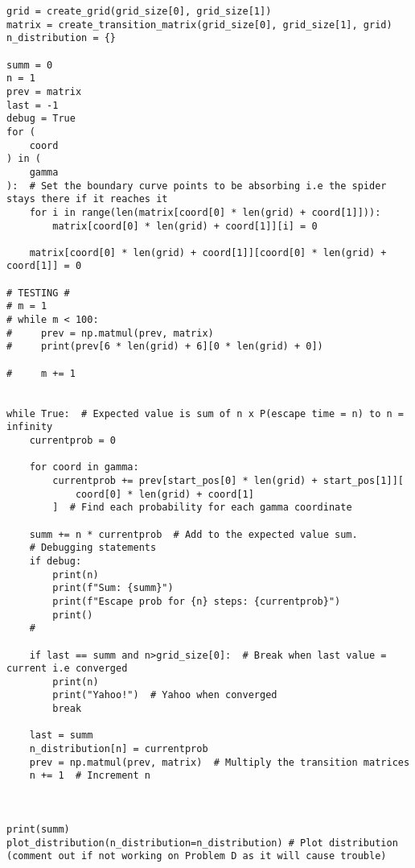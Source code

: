 \documentclass[12pt,a4paper]{article}
\begin{document}
\begin{lstlisting}
grid = create_grid(grid_size[0], grid_size[1])
matrix = create_transition_matrix(grid_size[0], grid_size[1], grid)
n_distribution = {}

summ = 0
n = 1
prev = matrix
last = -1
debug = True
for (
    coord
) in (
    gamma
):  # Set the boundary curve points to be absorbing i.e the spider stays there if it reaches it
    for i in range(len(matrix[coord[0] * len(grid) + coord[1]])):
        matrix[coord[0] * len(grid) + coord[1]][i] = 0

    matrix[coord[0] * len(grid) + coord[1]][coord[0] * len(grid) + coord[1]] = 0

# TESTING #
# m = 1
# while m < 100:
#     prev = np.matmul(prev, matrix)
#     print(prev[6 * len(grid) + 6][0 * len(grid) + 0])

#     m += 1


while True:  # Expected value is sum of n x P(escape time = n) to n = infinity
    currentprob = 0

    for coord in gamma:
        currentprob += prev[start_pos[0] * len(grid) + start_pos[1]][
            coord[0] * len(grid) + coord[1]
        ]  # Find each probability for each gamma coordinate

    summ += n * currentprob  # Add to the expected value sum.
    # Debugging statements
    if debug:
        print(n)
        print(f"Sum: {summ}")
        print(f"Escape prob for {n} steps: {currentprob}")
        print()
    #

    if last == summ and n>grid_size[0]:  # Break when last value = current i.e converged
        print(n)
        print("Yahoo!")  # Yahoo when converged
        break

    last = summ
    n_distribution[n] = currentprob
    prev = np.matmul(prev, matrix)  # Multiply the transition matrices
    n += 1  # Increment n



print(summ)
plot_distribution(n_distribution=n_distribution) # Plot distribution (comment out if not working on Problem D as it will cause trouble)

\end{lstlisting}
\end{document}
